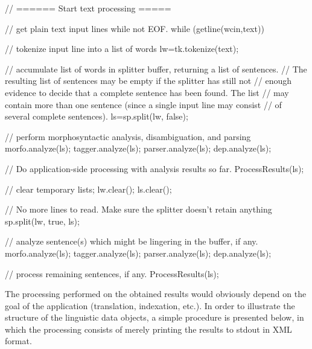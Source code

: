 \documentclass[a4paper]{book}
\begin{document}
{\begin{LSTverbatim}
{  // ====== Start text processing =====

  // get plain text input lines while not EOF.
  while (getline(wcin,text)) {
    
    // tokenize input line into a list of words
    lw=tk.tokenize(text);
    
    // accumulate list of words in splitter buffer, returning a list of sentences.
    // The resulting list of sentences may be empty if the splitter has still not 
    // enough evidence to decide that a complete sentence has been found. The list
    // may contain more than one sentence (since a single input line may consist 
    // of several complete sentences).
    ls=sp.split(lw, false);
    
    // perform  morphosyntactic analysis, disambiguation, and parsing
    morfo.analyze(ls);
    tagger.analyze(ls);
    parser.analyze(ls);
    dep.analyze(ls);

    // Do application-side processing with analysis results so far.
    ProcessResults(ls);
    
    // clear temporary lists;
    lw.clear(); ls.clear();    
  }
  
  // No more lines to read. Make sure the splitter doesn't retain anything  
  sp.split(lw, true, ls);   
 
  // analyze sentence(s) which might be lingering in the buffer, if any.
  morfo.analyze(ls);
  tagger.analyze(ls);
  parser.analyze(ls);
  dep.analyze(ls);

  // process remaining sentences, if any.
  ProcessResults(ls);
  
}
\end{LSTverbatim}
}



 The processing performed on the obtained results would obviously
 depend on the goal of the application (translation, indexation,
 etc.). In order to illustrate the structure of the linguistic data
 objects, a simple procedure is presented below, in which the processing
 consists of merely printing the results to stdout in XML format.
\end{document}
